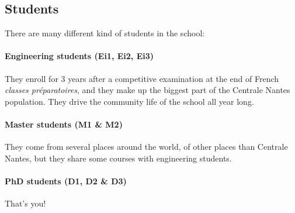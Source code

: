 \subsection{Students}
There are many different kind of students in the school:
\paragraph{Engineering students (Ei1, Ei2, Ei3)} They enroll for 3 years after a competitive examination at the end of French \textit{classes préparatoires}, and they make up the biggest part of the Centrale Nantes population. They drive the community life of the school all year long. %
\paragraph{Master students (M1 \& M2)} They come from several places around the world, of other places than Centrale Nantes, but they share some courses with engineering students. %
\paragraph{PhD students (D1, D2 \& D3)} That's you!

